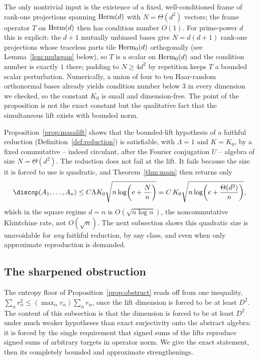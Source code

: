 \begin{remark}\label{rem:conditioning}
The only nontrivial input is the existence of a fixed, well-conditioned frame of
rank-one projections spanning $\mathrm{Herm}(d)$ with $N=\Theta(d^2)$ vectors; the frame
operator $T$ on $\mathrm{Herm}(d)$ then has condition number $O(1)$. For prime-power $d$
this is explicit: the $d+1$ mutually unbiased bases give $N=d(d+1)$ rank-one
projections whose traceless parts tile $\mathrm{Herm}_0(d)$ orthogonally (see
Lemma~\ref{lem:mubspan} below), so $T$ is a scalar on $\mathrm{Herm}_0(d)$ and the
condition number is exactly $1$ there; padding to $N\ge 4d^2$ by repetition keeps
$T$ a bounded scalar perturbation. Numerically, a union of four to ten Haar-random
orthonormal bases already yields condition number below $3$ in every dimension we
checked, so the constant $K_0$ is small and dimension-free. The point of the
proposition is not the exact constant but the qualitative fact that the
simultaneous lift exists with bounded norm.
\end{remark}

Proposition~\ref{prop:masalift} shows that the bounded-lift hypothesis of a
faithful reduction (Definition~\ref{def:reduction}) is satisfiable, with
$\Lambda=1$ and $K=K_0$, by a fixed commutative -- indeed circulant, after the
Fourier conjugation $U$ -- algebra of size $N=\Theta(d^2)$. The reduction does not
fail at the lift. It fails because the size it is forced to use is quadratic, and
Theorem~\ref{thm:main} then returns only
\[
\discop(A_1,\ldots,A_n)
\le C\Lambda K_0\sqrt{n\log\!\left(e+\frac{N}{n}\right)}
=C\,K_0\sqrt{n\log\!\left(e+\frac{\Theta(d^2)}{n}\right)},
\]
which in the square regime $d=n$ is $O(\sqrt{n\log n})$, the noncommutative
Khintchine rate, not $O(\sqrt n)$. The next subsection shows this quadratic size
is unavoidable for \emph{any} faithful reduction, by any class, and even when only
approximate reproduction is demanded.

\subsection{The sharpened obstruction}
\label{subsec:nogo}

The entropy floor of Proposition~\ref{prop:obstruct} reads off from one
inequality, $\sum_\alpha r_\alpha^2\le(\max_\alpha r_\alpha)\sum_\alpha r_\alpha$,
once the lift dimension is forced to be at least $D^2$. The content of this
subsection is that the dimension is forced to be at least $D^2$ under much weaker
hypotheses than exact surjectivity onto the abstract algebra: it is forced by the
single requirement that signed sums of the lifts reproduce signed sums of
arbitrary targets in operator norm. We give the exact statement, then its
completely bounded and approximate strengthenings.

